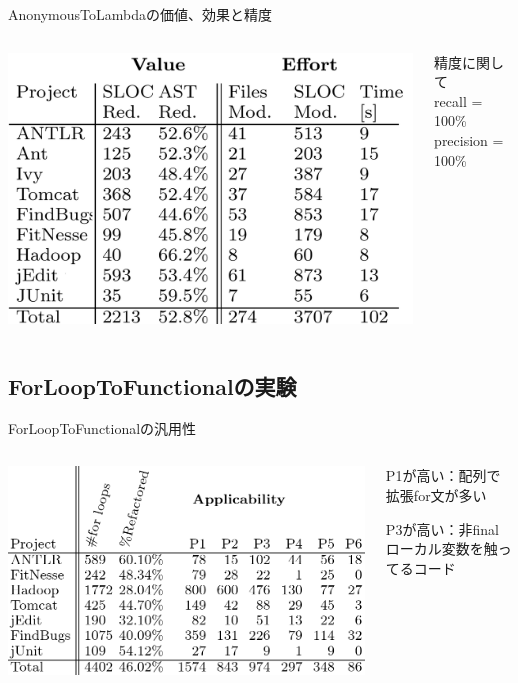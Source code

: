 \begin{frame}{AnonymousToLambdaの価値、効果と精度}
\begin{columns}
  \begin{column}{0.7\textwidth}
\includegraphics[width=\textwidth,height=.8\textheight,keepaspectratio]{aicvalue}
\end{column}
\begin{column}{0.3\textwidth}
  精度に関して\\
  recall = 100\%
  precision = 100\%
\end{column}
\end{columns}
\end{frame}
\subsection{ForLoopToFunctionalの実験}
\begin{frame}{ForLoopToFunctionalの汎用性}
  \begin{columns}
    \begin{column}{0.8\textwidth}
\includegraphics[width=\textwidth,height=.8\textheight,keepaspectratio]{forapp}
\end{column}
\begin{column}{0.2\textwidth}
  P1が高い：配列で拡張for文が多い

  P3が高い：非finalローカル変数を触ってるコード
\end{column}
\end{columns}
\end{frame}

